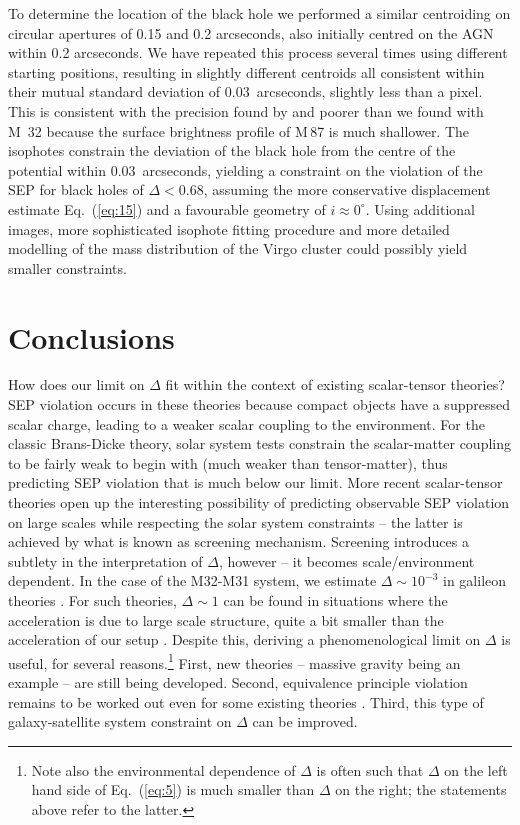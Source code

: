 \documentclass[useAMS,usenatbib]{mn2e}
\begin{document}
To determine the location of the black hole we performed a similar
centroiding on circular
apertures
of 0.15 and 0.2 arcseconds, also initially centred on the AGN within
0.2 arcseconds.  We have repeated this process several times using
different starting positions, resulting in slightly different
centroids all consistent within their mutual standard deviation of
0.03~arcseconds, slightly less than a pixel.  This is consistent with
the precision found by \citet{2013ApJ...770...86W} and poorer than we
found with M~32 because the surface brightness profile of M\,87 is
much shallower.  The isophotes constrain the deviation of the black
hole from the centre of the potential within 0.03~arcseconds, yielding
a constraint on the violation of the SEP for black holes of
$\Delta<0.68$, assuming the more conservative displacement estimate
Eq.~(\ref{eq:15}) and a favourable geometry of $i\approx 0^\circ$.
Using additional images, more sophisticated isophote fitting procedure
and more detailed modelling of the mass distribution of the Virgo
cluster could possibly yield smaller constraints.


\section{Conclusions}
\label{conclusions}

How does our limit on $\Delta$ fit within the context of existing
scalar-tensor theories? SEP violation occurs in these theories because
compact objects have a suppressed scalar charge, leading to a weaker
scalar coupling to the environment. For the classic Brans-Dicke
theory, solar system tests constrain the scalar-matter coupling to be
fairly weak to begin with (much weaker than tensor-matter), thus
predicting SEP violation that is much below our limit.  More recent
scalar-tensor theories open up the interesting possibility of
predicting observable SEP violation on large scales while respecting
the solar system constraints -- the latter is achieved by what is
known as screening mechanism. Screening introduces a subtlety in the
interpretation of $\Delta$, however -- it becomes scale/environment
dependent. In the case of the M32-M31 system, we estimate $\Delta \sim
10^{-3}$ in galileon theories \citep{2009PhRvD..79f4036N}.  For such
theories, $\Delta \sim 1$ can be found in situations where the
acceleration is due to large scale structure, quite a bit smaller than
the acceleration of our setup \citep{2012PhRvL.109e1304H}.  Despite
this, deriving a phenomenological limit on $\Delta$ is useful, for
several reasons.\footnote{Note also the environmental dependence of
  $\Delta$ is often such that $\Delta$ on the left hand side of Eq.~(\ref{eq:5})
  is much smaller than $\Delta$ on the right; the statements above
  refer to the latter.}  First, new theories -- massive gravity being
an example -- are still being developed. Second, equivalence principle
violation remains to be worked out even for some existing theories
\citep{2009PhRvD..80j4002H}.  Third, this type of galaxy-satellite
system constraint on $\Delta$ can be improved.
\end{document}

